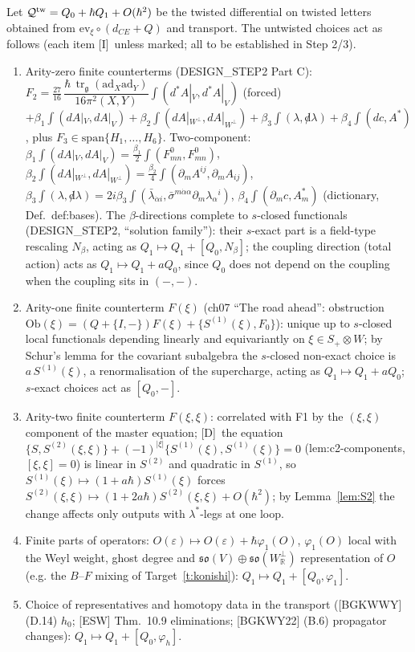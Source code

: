 \documentclass[11pt]{article}
\theoremstyle{definition}
\newcommand{\tr}{\operatorname{tr}}
\newcommand{\Dl}{\textup{[D]}}
\newcommand{\Il}{\textup{[I]}}
\newcommand{\unit}{\dfrac{\hbar\,\tr_{\mathfrak g}(\mathrm{ad}_X\mathrm{ad}_Y)}{16\pi^2(X,Y)}}
\begin{document}
Let $\mathcal Q^{\rm tw}=Q_0+\hbar Q_1+O(\hbar^2)$ be the twisted differential on twisted letters obtained from $\mathrm{ev}_\xi\circ(d_{CE}+Q)$ and transport. The untwisted choices act as follows (each item \Il\ unless marked; all to be established in Step 2/3).
\begin{enumerate}
\item[F0.] Arity-zero finite counterterms (DESIGN\_STEP2 Part C): $F_2=\frac{27}{16}\,\unit\int(d^*A|_V,d^*A|_V)$ (forced) $+\beta_1\int(dA|_V,dA|_V)+\beta_2\int(dA|_{W^\perp},dA|_{W^\perp})+\beta_3\int(\lambda,{\not d}\lambda)+\beta_4\int(dc,A^*)$, plus $F_3\in\mathrm{span}\{H_1,\dots,H_6\}$. Two-component: $\beta_1\int(dA|_V,dA|_V)=\frac{\beta_1}2\int(F^0_{mn},F^0_{mn})$, $\beta_2\int(dA|_{W^\perp},dA|_{W^\perp})=\frac{\beta_2}4\int(\partial_mA^{ij},\partial_mA_{ij})$, $\beta_3\int(\lambda,{\not d}\lambda)=2i\beta_3\int(\bar\lambda_{\dot\alpha i},\bar\sigma^{m\dot\alpha\alpha}\partial_m\lambda_\alpha{}^i)$, $\beta_4\int(\partial_mc,A^*_m)$ (dictionary, Def.~def:bases). The $\beta$-directions complete to $s$-closed functionals (DESIGN\_STEP2, ``solution family''): their $s$-exact part is a field-type rescaling $N_\beta$, acting as $Q_1\mapsto Q_1+[Q_0,N_\beta]$; the coupling direction (total action) acts as $Q_1\mapsto Q_1+aQ_0$, since $Q_0$ does not depend on the coupling when the coupling sits in $(-,-)$.
\item[F1.] Arity-one finite counterterm $F(\xi)$ (ch07 ``The road ahead'': obstruction $\mathrm{Ob}(\xi)=(Q+\{I,-\})F(\xi)+\{S^{(1)}(\xi),F_0\}$): unique up to $s$-closed local functionals depending linearly and equivariantly on $\xi\in S_+\otimes W$; by Schur's lemma for the covariant subalgebra the $s$-closed non-exact choice is $a\,S^{(1)}(\xi)$, a renormalisation of the supercharge, acting as $Q_1\mapsto Q_1+aQ_0$; $s$-exact choices act as $[Q_0,-]$.
\item[F2.] Arity-two finite counterterm $F(\xi,\xi)$: correlated with F1 by the $(\xi,\xi)$ component of the master equation; \Dl\ the equation $\{S,S^{(2)}(\xi,\xi)\}+(-1)^{|\xi|}\{S^{(1)}(\xi),S^{(1)}(\xi)\}=0$ (lem:c2-components, $[\xi,\xi]=0$) is linear in $S^{(2)}$ and quadratic in $S^{(1)}$, so $S^{(1)}(\xi)\mapsto(1+a\hbar)S^{(1)}(\xi)$ forces $S^{(2)}(\xi,\xi)\mapsto(1+2a\hbar)S^{(2)}(\xi,\xi)+O(\hbar^2)$; by Lemma~\ref{lem:S2} the change affects only outputs with $\lambda^*$-legs at one loop.
\item[F3.] Finite parts of operators: $O(\varepsilon)\mapsto O(\varepsilon)+\hbar\varphi_1(O)$, $\varphi_1(O)$ local with the Weyl weight, ghost degree and $\mathfrak{so}(V)\oplus\mathfrak{so}(W^\perp_{\mathbb R})$ representation of $O$ (e.g. the $B$--$F$ mixing of Target~\ref{t:konishi}): $Q_1\mapsto Q_1+[Q_0,\varphi_1]$.
\item[F4.] Choice of representatives and homotopy data in the transport ([BGKWWY] (D.14) $h_0$; [ESW] Thm.~10.9 eliminations; [BGKWY22] (B.6) propagator changes): $Q_1\mapsto Q_1+[Q_0,\varphi_h]$.
\end{enumerate}
\end{document}

